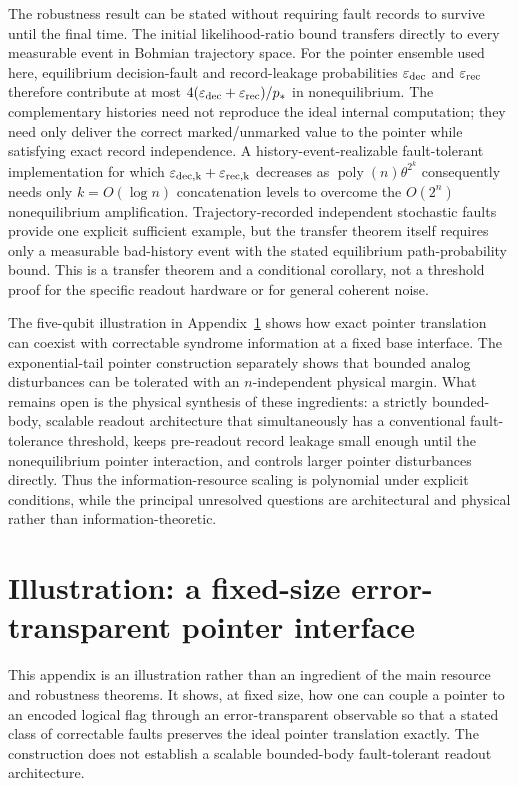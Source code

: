 \documentclass[pdflatex,sn-mathphys-num]{sn-jnl}
\theoremstyle{thmstyleone}
\begin{document}
The robustness result can be stated without requiring fault records to survive until the final time. The initial likelihood-ratio bound transfers directly to every measurable event in Bohmian trajectory space. For the pointer ensemble used here, equilibrium decision-fault and record-leakage probabilities $\varepsilon_{\rm dec}$ and $\varepsilon_{\rm rec}$ therefore contribute at most $4(\varepsilon_{\rm dec}+\varepsilon_{\rm rec})/p_*$ in nonequilibrium. The complementary histories need not reproduce the ideal internal computation; they need only deliver the correct marked/unmarked value to the pointer while satisfying exact record independence. A history-event-realizable fault-tolerant implementation for which $\varepsilon_{\rm dec,k}+\varepsilon_{\rm rec,k}$ decreases as $\operatorname{poly}(n)\theta^{2^k}$ consequently needs only $k=O(\log n)$ concatenation levels to overcome the $O(2^n)$ nonequilibrium amplification. Trajectory-recorded independent stochastic faults provide one explicit sufficient example, but the transfer theorem itself requires only a measurable bad-history event with the stated equilibrium path-probability bound. This is a transfer theorem and a conditional corollary, not a threshold proof for the specific readout hardware or for general coherent noise.

The five-qubit illustration in Appendix~\ref{app:interface} shows how exact pointer translation can coexist with correctable syndrome information at a fixed base interface. The exponential-tail pointer construction separately shows that bounded analog disturbances can be tolerated with an $n$-independent physical margin. What remains open is the physical synthesis of these ingredients: a strictly bounded-body, scalable readout architecture that simultaneously has a conventional fault-tolerance threshold, keeps pre-readout record leakage small enough until the nonequilibrium pointer interaction, and controls larger pointer disturbances directly. Thus the information-resource scaling is polynomial under explicit conditions, while the principal unresolved questions are architectural and physical rather than information-theoretic.

\clearpage
\appendix

\section{Illustration: a fixed-size error-transparent pointer interface}\label{app:interface}

This appendix is an illustration rather than an ingredient of the main resource and robustness theorems. It shows, at fixed size, how one can couple a pointer to an encoded logical flag through an error-transparent observable so that a stated class of correctable faults preserves the ideal pointer translation exactly. The construction does not establish a scalable bounded-body fault-tolerant readout architecture.
\end{document}
